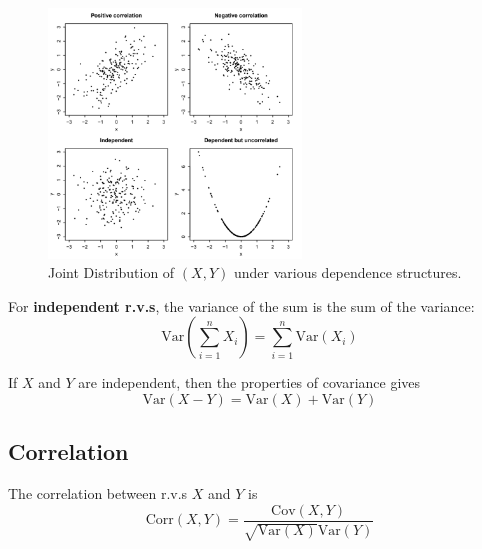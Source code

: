 \documentclass{article}
\begin{document}
\begin{figure}[H]
    \centering
    \includegraphics[width=0.6\textwidth]{Images/covariancegraph.png}
    \caption{Joint Distribution of $(X,Y)$ under various dependence structures.}
    \label{fig:10-covariancegraph}
\end{figure} 

\begin{theorem}
    For \textbf{independent r.v.s}, the variance of the sum is the sum of the variance: \begin{equation}
        \text{Var} \left( \sum_{i=1}^{n} X_i\right) = \sum_{i=1}^{n} \text{Var}(X_i)
    \end{equation}
\end{theorem}

\begin{theorem}
    If $X$ and $Y$ are independent, then the properties of covariance gives \begin{equation}
        \text{Var} (X-Y) = \text{Var}(X) + \text{Var} (Y)
    \end{equation}
\end{theorem}

\subsection{Correlation}

\begin{definition}
    The correlation between r.v.s $X$ and $Y$ is \begin{equation}\label{eq:10-correlation}
        \text{Corr} (X,Y) = \frac{\text{Cov}(X,Y)}{\sqrt{\text{Var}(X)}\text{Var}(Y)}
    \end{equation}
\end{definition}
\end{document}
